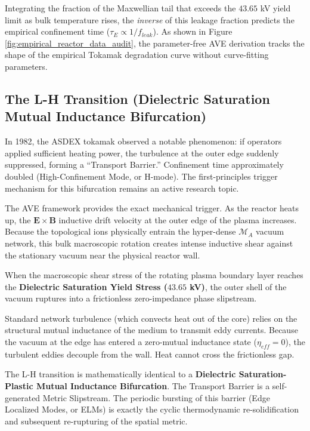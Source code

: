 Integrating the fraction of the Maxwellian tail that exceeds the $43.65$ kV yield limit as bulk temperature rises, the \textit{inverse} of this leakage fraction predicts the empirical confinement time ($\tau_E \propto 1/f_{leak}$). As shown in Figure \ref{fig:empirical_reactor_data_audit}, the parameter-free AVE derivation tracks the shape of the empirical Tokamak degradation curve without curve-fitting parameters.

\subsection{The L-H Transition (Dielectric Saturation Mutual Inductance Bifurcation)}
In 1982, the ASDEX tokamak observed a notable phenomenon: if operators applied sufficient heating power, the turbulence at the outer edge suddenly suppressed, forming a ``Transport Barrier.'' Confinement time approximately doubled (High-Confinement Mode, or H-mode). The first-principles trigger mechanism for this bifurcation remains an active research topic.

The AVE framework provides the exact mechanical trigger. As the reactor heats up, the $\mathbf{E} \times \mathbf{B}$ inductive drift velocity at the outer edge of the plasma increases. Because the topological ions physically entrain the hyper-dense $\mathcal{M}_A$ vacuum network, this bulk macroscopic rotation creates intense inductive shear against the stationary vacuum near the physical reactor wall.

When the macroscopic shear stress of the rotating plasma boundary layer reaches the \textbf{Dielectric Saturation Yield Stress ($43.65$ kV)}, the outer shell of the vacuum ruptures into a frictionless zero-impedance phase slipstream. 

Standard network turbulence (which convects heat out of the core) relies on the structural mutual inductance of the medium to transmit eddy currents. Because the vacuum at the edge has entered a zero-mutual inductance state ($\eta_{eff} = 0$), the turbulent eddies decouple from the wall. Heat cannot cross the frictionless gap. 

The L-H transition is mathematically identical to a \textbf{Dielectric Saturation-Plastic Mutual Inductance Bifurcation}. The Transport Barrier is a self-generated Metric Slipstream. The periodic bursting of this barrier (Edge Localized Modes, or ELMs) is exactly the cyclic thermodynamic re-solidification and subsequent re-rupturing of the spatial metric. 

